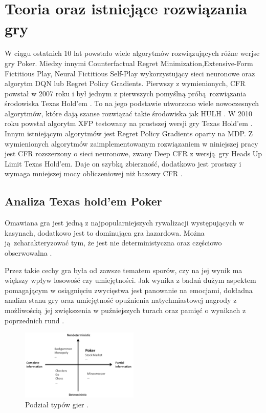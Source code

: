 \documentclass[12pt,oneside,a4paper]{report}
\begin{document}
\section{Teoria oraz istniejące rozwiązania gry}

W ciągu ostatnich 10 lat powstało wiele algorytmów rozwiązujących różne werjse gry Poker.
Miedzy innymi Counterfactual Regret Minimization,Extensive-Form Fictitious Play, 
Neural Fictitious Self-Play wykorzystujący sieci neuronowe  oraz algorytm DQN lub
Regret Policy Gradients. Pierwszy z wymienionych, CFR powstał w 2007 roku i był jednym z pierwszych 
pomyślną próbą rozwiązania środowiska Texas Hold'em \cite{rmg}. To na jego podstawie utworzono wiele nowoczesnych
algorytmów, które dają szanse rozwiązać takie środowiska jak HULH \cite{eq}. W 2010 roku powstał algorytm XFP testowany na 
prostszej wersji gry Texas Hold'em \cite{FSEG}. Innym istniejącym algorytmów jest
Regret Policy Gradients oparty na MDP.
Z wymienionych algorytmów zaimplementowanym rozwiązaniem w niniejszej pracy jest CFR 
rozszerzony o sieci neuronowe,
zwany Deep CFR z wersją gry Heads Up Limit Texas Hold'em. Daje on szybką zbierzność,
dodatkowo jest prostszy i wymaga mniejszej mocy obliczeniowej niż bazowy 
CFR \cite{dcfr}.

\subsection{Analiza Texas hold'em Poker}

Omawiana gra jest jedną z najpopularniejszych rywalizacji występujących w kasynach, dodatkowo jest to
dominująca gra hazardowa. Można ją zcharakteryzować tym, że jest nie deterministyczna oraz częściowo 
obserwowalna \cite{sp}.  


Przez takie cechy gra była od zawsze tematem sporów, czy na jej wynik ma większy wpływ
losowość czy umiejętności. Jak wynika z badań dużym aspektem pomagającym w osiągnięciu zwycięstwa 
jest panowanie na emocjami, dokładna analiza stanu gry oraz umiejętność opuźnienia natychmiastowej
nagrody z możliwością jej zwiększenia w puźniejszych turach oraz pamięć o wynikach z poprzednich 
rund \cite{gm}. 

\begin{figure}[h!]
            \center
           \includegraphics[width=0.5\textwidth]{./img/classification.pdf}
           \caption{Podział typów gier \cite{sp}.}
\end{figure}
\end{document}
